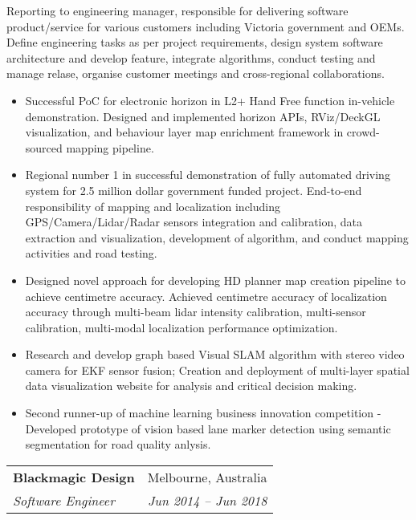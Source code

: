 \documentclass[letterpaper,11pt]{article}
\makeatletter
\newcommand{\resumeItemNoBullet}[4]{
  \vspace{-1pt}
    \begin{tabular*}{0.97\textwidth}{l@{\extracolsep{\fill}}r}
      \textbf{#1} & #2 \\
      \textit{\small#3} & \textit{\small #4} \\
    \end{tabular*}\vspace{-7pt}
}
\newcommand{\resumeSubHeadingListStart}{\begin{itemize}[leftmargin=*]}
\newcommand{\resumeSubHeadingListEnd}{\end{itemize}}
\makeatother
\begin{document}
\vspace{10pt}
{Reporting to engineering manager, responsible for delivering software product/service for various customers including Victoria government and OEMs. Define engineering tasks as per project requirements, design system software architecture and develop feature, integrate algorithms, conduct testing and manage relase, organise customer meetings and cross-regional collaborations. }
  \resumeSubHeadingListStart
    \item Successful PoC for electronic horizon in L2+ Hand Free function in-vehicle demonstration. Designed and implemented horizon APIs, RViz/DeckGL visualization, and behaviour layer map enrichment framework in crowd-sourced mapping pipeline.
    \item Regional number 1 in successful demonstration of fully automated driving system for 2.5 million dollar government funded project. End-to-end responsibility of mapping and localization including GPS/Camera/Lidar/Radar sensors integration and calibration, data extraction and visualization, development of algorithm, and conduct mapping activities and road testing.
    \item Designed novel approach for developing HD planner map creation pipeline to achieve centimetre accuracy. Achieved centimetre accuracy of localization accuracy through multi-beam lidar intensity calibration, multi-sensor calibration, multi-modal localization performance optimization.
    \item Research and develop graph based Visual SLAM algorithm with stereo video camera for EKF sensor fusion; Creation and deployment of multi-layer spatial data visualization website for analysis and critical decision making.
    \item Second runner-up of machine learning business innovation competition - Developed prototype of vision based lane marker detection using semantic segmentation for road quality anlysis.
  \resumeSubHeadingListEnd

\resumeItemNoBullet
{Blackmagic Design}{Melbourne, Australia}
{Software Engineer}{Jun 2014 -- Jun 2018}
\end{document}
